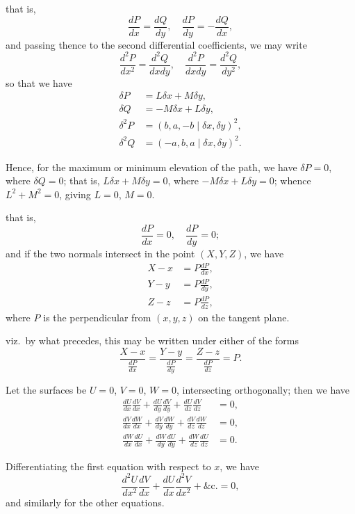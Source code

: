\documentclass[11pt,a4paper]{article}
\theoremstyle{plain}
\theoremstyle{definition}
\theoremstyle{remark}
\begin{document}
\newpage

that is,
\[
\frac{dP}{dx} = \frac{dQ}{dy}, \quad \frac{dP}{dy} = -\frac{dQ}{dx},
\]
and passing thence to the second differential coefficients, we may write
\[
\frac{d^2P}{dx^2} = \frac{d^2Q}{dxdy}, \quad \frac{d^2P}{dxdy} = \frac{d^2Q}{dy^2},
\]
so that we have
\begin{align*}
\delta P &= L\delta x + M\delta y, \\
\delta Q &= -M\delta x + L\delta y, \\
\delta^2 P &= (b, a, -b \mid \delta x, \delta y)^2, \\
\delta^2 Q &= (-a, b, a \mid \delta x, \delta y)^2.
\end{align*}

Hence, for the maximum or minimum elevation of the path, we have $\delta P = 0$, where $\delta Q = 0$; that is, $L\delta x + M\delta y = 0$, where $-M\delta x + L\delta y = 0$; whence $L^2 + M^2 = 0$, giving $L = 0$, $M = 0$.

\newpage

that is,
\[
\frac{dP}{dx} = 0, \quad \frac{dP}{dy} = 0;
\]
and if the two normals intersect in the point $(X, Y, Z)$, we have
\begin{align*}
X - x &= P\frac{dP}{dx}, \\
Y - y &= P\frac{dP}{dy}, \\
Z - z &= P\frac{dP}{dz},
\end{align*}
where $P$ is the perpendicular from $(x, y, z)$ on the tangent plane.

viz.\ by what precedes, this may be written under either of the forms
\[
\frac{X - x}{\frac{dP}{dx}} = \frac{Y - y}{\frac{dP}{dy}} = \frac{Z - z}{\frac{dP}{dz}} = P.
\]

\newpage

Let the surfaces be $U = 0$, $V = 0$, $W = 0$, intersecting orthogonally; then we have
\begin{align*}
\frac{dU}{dx}\frac{dV}{dx} + \frac{dU}{dy}\frac{dV}{dy} + \frac{dU}{dz}\frac{dV}{dz} &= 0, \\
\frac{dV}{dx}\frac{dW}{dx} + \frac{dV}{dy}\frac{dW}{dy} + \frac{dV}{dz}\frac{dW}{dz} &= 0, \\
\frac{dW}{dx}\frac{dU}{dx} + \frac{dW}{dy}\frac{dU}{dy} + \frac{dW}{dz}\frac{dU}{dz} &= 0.
\end{align*}

Differentiating the first equation with respect to $x$, we have
\[
\frac{d^2U}{dx^2}\frac{dV}{dx} + \frac{dU}{dx}\frac{d^2V}{dx^2} + \&\text{c.} = 0,
\]
and similarly for the other equations.
\end{document}
